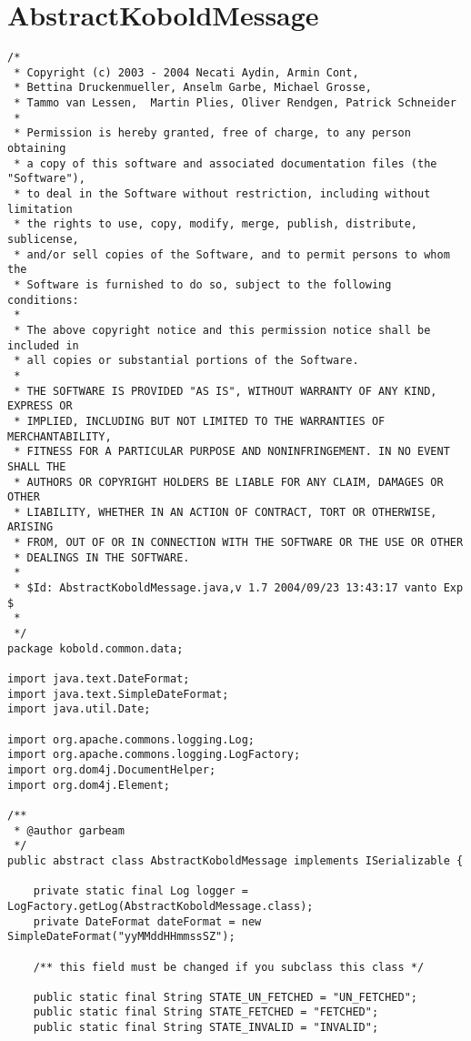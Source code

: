 \section{AbstractKoboldMessage}
\small \begin{verbatim}
/*
 * Copyright (c) 2003 - 2004 Necati Aydin, Armin Cont, 
 * Bettina Druckenmueller, Anselm Garbe, Michael Grosse, 
 * Tammo van Lessen,  Martin Plies, Oliver Rendgen, Patrick Schneider
 * 
 * Permission is hereby granted, free of charge, to any person obtaining
 * a copy of this software and associated documentation files (the "Software"),
 * to deal in the Software without restriction, including without limitation
 * the rights to use, copy, modify, merge, publish, distribute, sublicense, 
 * and/or sell copies of the Software, and to permit persons to whom the 
 * Software is furnished to do so, subject to the following conditions:
 *
 * The above copyright notice and this permission notice shall be included in 
 * all copies or substantial portions of the Software.
 *
 * THE SOFTWARE IS PROVIDED "AS IS", WITHOUT WARRANTY OF ANY KIND, EXPRESS OR 
 * IMPLIED, INCLUDING BUT NOT LIMITED TO THE WARRANTIES OF MERCHANTABILITY, 
 * FITNESS FOR A PARTICULAR PURPOSE AND NONINFRINGEMENT. IN NO EVENT SHALL THE 
 * AUTHORS OR COPYRIGHT HOLDERS BE LIABLE FOR ANY CLAIM, DAMAGES OR OTHER 
 * LIABILITY, WHETHER IN AN ACTION OF CONTRACT, TORT OR OTHERWISE, ARISING 
 * FROM, OUT OF OR IN CONNECTION WITH THE SOFTWARE OR THE USE OR OTHER 
 * DEALINGS IN THE SOFTWARE.
 *
 * $Id: AbstractKoboldMessage.java,v 1.7 2004/09/23 13:43:17 vanto Exp $
 *
 */
package kobold.common.data;

import java.text.DateFormat;
import java.text.SimpleDateFormat;
import java.util.Date;

import org.apache.commons.logging.Log;
import org.apache.commons.logging.LogFactory;
import org.dom4j.DocumentHelper;
import org.dom4j.Element;

/**
 * @author garbeam
 */
public abstract class AbstractKoboldMessage implements ISerializable {

	private static final Log logger = LogFactory.getLog(AbstractKoboldMessage.class);
	private DateFormat dateFormat = new SimpleDateFormat("yyMMddHHmmssSZ");
	
	/** this field must be changed if you subclass this class */
	
	public static final String STATE_UN_FETCHED = "UN_FETCHED"; 
	public static final String STATE_FETCHED = "FETCHED";
	public static final String STATE_INVALID = "INVALID";
	

\end{verbatim}
